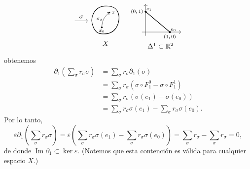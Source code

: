 \begin{dem}
\[\begin{tikzpicture}[baseline=(current bounding box.center), scale=0.95]
    \draw[->] (2.7, 0.8) -- (3.4, 0.8) node[midway, above] {$\sigma$};

    \draw[thick] plot[smooth cycle, tension=0.8] coordinates {(3.7, 0.45) (4.2, 0.1) (4.9, 0.4) (5.0, 1.3) (4.3, 1.6) (3.7, 1.2)};
    \node[below] at (4.35, -0.15) {$X$};

    \coordinate (X0) at (4.15, 0.45);
    \coordinate (XX) at (4.55, 1.25);
    \fill (X0) circle (1.3pt) node[below] {\scriptsize $x_0$};
    \fill (XX) circle (1.3pt) node[right] {\scriptsize $x$};
    \draw[->] (X0) to[bend left=25] node[left, inner sep=1pt] {\scriptsize $\sigma_x$} (XX);

    \begin{scope}[xshift=6.5cm, yshift=0.2cm]
        \draw[->] (-0.2, 0) -- (1.9, 0);
        \draw[->] (0, -0.2) -- (0, 1.5);
        \draw[thick] (0, 1.1) -- (1.3, 0);
        \fill (0, 1.1) circle (1.5pt) node[left] {\scriptsize $(0,1)$} node[above right, inner sep=1pt] {\scriptsize $e_1$};
        \fill (1.3, 0) circle (1.5pt) node[below] {\scriptsize $(1,0)$} node[above right, inner sep=1pt] {\scriptsize $e_0$};
        \node[below] at (0.8, -0.45) {$\Delta^1 \subset \mathbb{R}^2$};
    \end{scope}
\end{tikzpicture}
\]
obtenemos
\begin{align*}
\partial_1\left(\sum_\sigma r_\sigma \sigma\right) &= \sum_\sigma r_\sigma \partial_1(\sigma) \\
&= \sum_\sigma r_\sigma (\sigma \circ F_1^0 - \sigma \circ F_1^1) \\
&= \sum_\sigma r_\sigma (\sigma(e_1) - \sigma(e_0)) \\
&= \sum_\sigma r_\sigma \sigma(e_1) - \sum_\sigma r_\sigma \sigma(e_0).
\end{align*}
Por lo tanto,
\[
\varepsilon \partial_1\left(\sum_\sigma r_\sigma \sigma\right) = \varepsilon\left(\sum_\sigma r_\sigma \sigma(e_1) - \sum_\sigma r_\sigma \sigma(e_0)\right) = \sum_\sigma r_\sigma - \sum_\sigma r_\sigma = 0,
\]
de donde $\operatorname{Im} \partial_1 \subset \ker \varepsilon$. (Notemos que esta contención es válida para cualquier espacio $X$.)


\end{dem}
